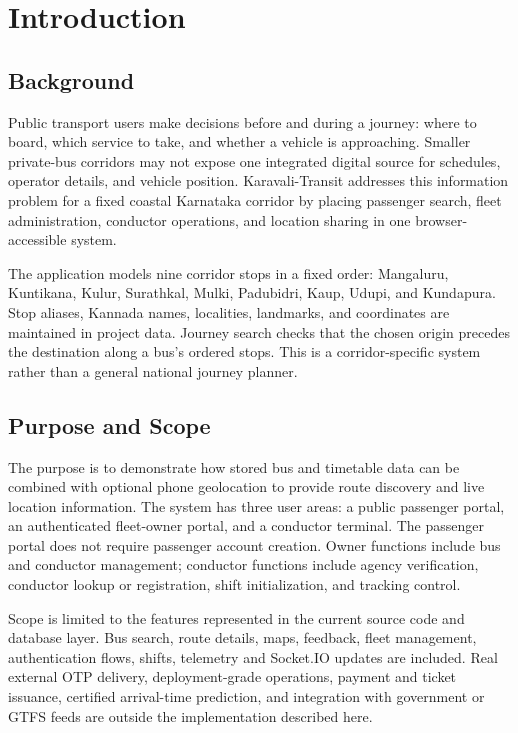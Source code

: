 \documentclass[12pt,a4paper]{report}
\begin{document}
\chapter{Introduction}
\section{Background}
Public transport users make decisions before and during a journey: where to board, which service to take, and whether a vehicle is approaching. Smaller private-bus corridors may not expose one integrated digital source for schedules, operator details, and vehicle position. Karavali-Transit addresses this information problem for a fixed coastal Karnataka corridor by placing passenger search, fleet administration, conductor operations, and location sharing in one browser-accessible system.

The application models nine corridor stops in a fixed order: Mangaluru, Kuntikana, Kulur, Surathkal, Mulki, Padubidri, Kaup, Udupi, and Kundapura. Stop aliases, Kannada names, localities, landmarks, and coordinates are maintained in project data. Journey search checks that the chosen origin precedes the destination along a bus's ordered stops. This is a corridor-specific system rather than a general national journey planner.

\section{Purpose and Scope}
The purpose is to demonstrate how stored bus and timetable data can be combined with optional phone geolocation to provide route discovery and live location information. The system has three user areas: a public passenger portal, an authenticated fleet-owner portal, and a conductor terminal. The passenger portal does not require passenger account creation. Owner functions include bus and conductor management; conductor functions include agency verification, conductor lookup or registration, shift initialization, and tracking control.

Scope is limited to the features represented in the current source code and database layer. Bus search, route details, maps, feedback, fleet management, authentication flows, shifts, telemetry and Socket.IO updates are included. Real external OTP delivery, deployment-grade operations, payment and ticket issuance, certified arrival-time prediction, and integration with government or GTFS feeds are outside the implementation described here.
\end{document}
